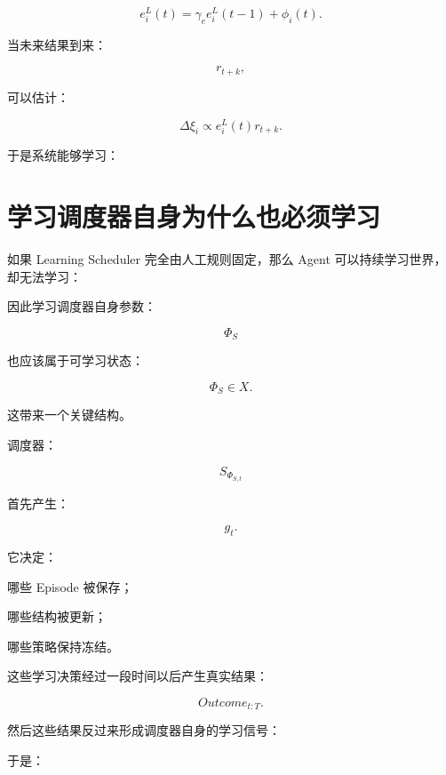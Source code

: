 \[
e_i^L(t)
=
\gamma_e e_i^L(t-1)
+
\phi_i(t).
\]

当未来结果到来：

\[
r_{t+k},
\]

可以估计：

\[
\Delta\xi_i
\propto
e_i^L(t)r_{t+k}.
\]

于是系统能够学习：

\begin{statementbox}
\centering
{}
\end{statementbox}


\section{学习调度器自身为什么也必须学习}

如果 Learning Scheduler 完全由人工规则固定，那么 Agent 可以持续学习世界，却无法学习：

\begin{statementbox}
\centering
{}
\end{statementbox}

因此学习调度器自身参数：

\[
\Phi_S
\]

也应该属于可学习状态：

\[
\boxed{
\Phi_S\in X.
}
\]

这带来一个关键结构。

调度器：

\[
S_{\Phi_{S,t}}
\]

首先产生：

\[
g_t.
\]

它决定：

哪些 Episode 被保存；

哪些结构被更新；

哪些策略保持冻结。

这些学习决策经过一段时间以后产生真实结果：

\[
Outcome_{t:T}.
\]

然后这些结果反过来形成调度器自身的学习信号：

\begin{statementbox}
\centering
{}
\end{statementbox}

于是：

